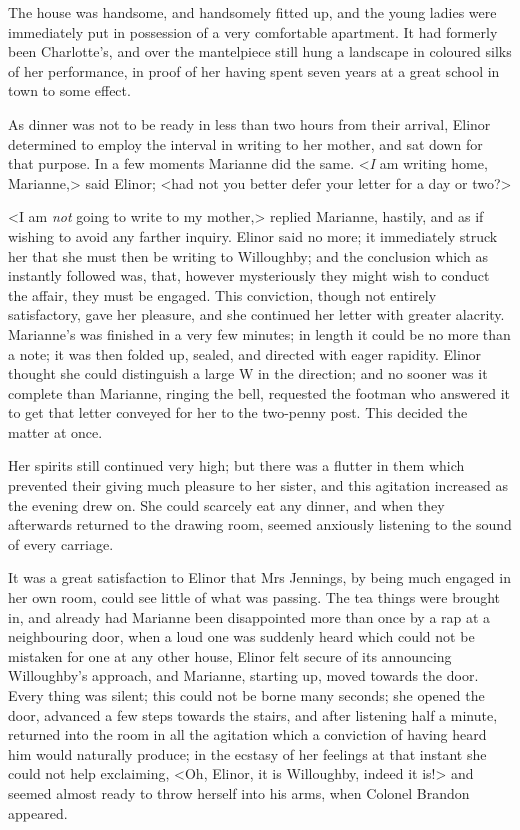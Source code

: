 The house was handsome, and handsomely fitted up, and the young ladies were immediately put in possession of a very comfortable apartment. It had formerly been Charlotte's, and over the mantelpiece still hung a landscape in coloured silks of her performance, in proof of her having spent seven years at a great school in town to some effect.

As dinner was not to be ready in less than two hours from their arrival, Elinor determined to employ the interval in writing to her mother, and sat down for that purpose. In a few moments Marianne did the same. <\textit{I} am writing home, Marianne,> said Elinor; <had not you better defer your letter for a day or two?>

<I am \textit{not} going to write to my mother,> replied Marianne, hastily, and as if wishing to avoid any farther inquiry. Elinor said no more; it immediately struck her that she must then be writing to Willoughby; and the conclusion which as instantly followed was, that, however mysteriously they might wish to conduct the affair, they must be engaged. This conviction, though not entirely satisfactory, gave her pleasure, and she continued her letter with greater alacrity. Marianne's was finished in a very few minutes; in length it could be no more than a note; it was then folded up, sealed, and directed with eager rapidity. Elinor thought she could distinguish a large W in the direction; and no sooner was it complete than Marianne, ringing the bell, requested the footman who answered it to get that letter conveyed for her to the two-penny post. This decided the matter at once.

Her spirits still continued very high; but there was a flutter in them which prevented their giving much pleasure to her sister, and this agitation increased as the evening drew on. She could scarcely eat any dinner, and when they afterwards returned to the drawing room, seemed anxiously listening to the sound of every carriage.

It was a great satisfaction to Elinor that Mrs Jennings, by being much engaged in her own room, could see little of what was passing. The tea things were brought in, and already had Marianne been disappointed more than once by a rap at a neighbouring door, when a loud one was suddenly heard which could not be mistaken for one at any other house, Elinor felt secure of its announcing Willoughby's approach, and Marianne, starting up, moved towards the door. Every thing was silent; this could not be borne many seconds; she opened the door, advanced a few steps towards the stairs, and after listening half a minute, returned into the room in all the agitation which a conviction of having heard him would naturally produce; in the ecstasy of her feelings at that instant she could not help exclaiming, <Oh, Elinor, it is Willoughby, indeed it is!> and seemed almost ready to throw herself into his arms, when Colonel Brandon appeared.

